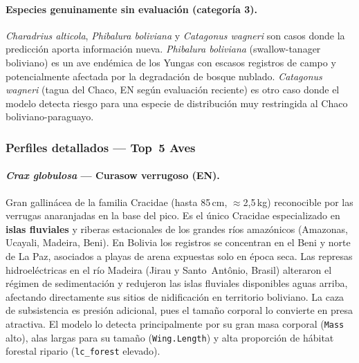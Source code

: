 \documentclass[12pt,a4paper]{article}
\begin{document}
\paragraph{Especies genuinamente sin evaluación (categoría 3).}
\textit{Charadrius alticola}, \textit{Phibalura boliviana} y \textit{Catagonus wagneri}
son casos donde la predicción aporta información nueva.
\textit{Phibalura boliviana} (swallow-tanager boliviano) es un ave endémica de los Yungas
con escasos registros de campo y potencialmente afectada por la degradación de bosque
nublado.
\textit{Catagonus wagneri} (tagua del Chaco, EN según evaluación reciente) es otro caso
donde el modelo detecta riesgo para una especie de distribución muy restringida al
Chaco boliviano-paraguayo.

\subsubsection{Perfiles detallados --- Top~5 Aves}

\paragraph{\textit{Crax globulosa} --- Curasow verrugoso (EN).}
Gran gallinácea de la familia Cracidae (hasta 85\,cm, $\approx$2,5\,kg) reconocible por
las verrugas anaranjadas en la base del pico.
Es el único Cracidae especializado en \textbf{islas fluviales} y riberas estacionales de
los grandes ríos amazónicos (Amazonas, Ucayali, Madeira, Beni).
En Bolivia los registros se concentran en el Beni y norte de La Paz, asociados a playas de
arena expuestas solo en época seca.
Las represas hidroeléctricas en el río Madeira (Jirau y Santo~Antônio, Brasil) alteraron el
régimen de sedimentación y redujeron las islas fluviales disponibles aguas arriba, afectando
directamente sus sitios de nidificación en territorio boliviano.
La caza de subsistencia es presión adicional, pues el tamaño corporal lo convierte en
presa atractiva.
El modelo lo detecta principalmente por su gran masa corporal (\texttt{Mass} alto),
alas largas para su tamaño (\texttt{Wing.Length}) y alta proporción de hábitat forestal
ripario (\texttt{lc\_forest} elevado).
\end{document}
